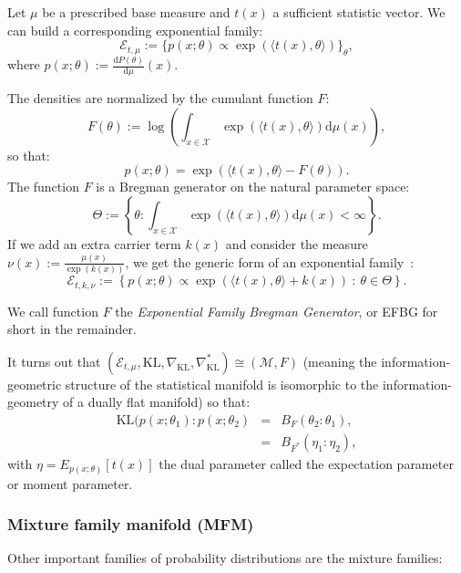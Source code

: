 \documentclass[graybox]{svmult}
\def\inner#1#2{{\langle #1,#2\rangle}}
\def\dmu{\mathrm{d}\mu}
\def\dP{\mathrm{d}P}
\def\KL{\mathrm{KL}}
\def\eqdef{:=}
\def\calE{\mathcal{E}}
\def\calX{\mathcal{X}}
\def\calM{\mathcal{M}}
\def\st{{\ :\ }}
\begin{document}
	\begin{definition}\label{def:ef}
	Let $\mu$ be a prescribed  base measure and $t(x)$ a sufficient statistic vector.
	We can build  a corresponding exponential family:
	\begin{equation}
	\calE_{t,\mu}\eqdef\{p(x;\theta) \propto \exp(\inner{t(x)}{\theta})\}_\theta,
	\end{equation}
	where $p(x;\theta) \eqdef \frac{\dP(\theta)}{\dmu}(x)$.
	
	The densities are normalized by the cumulant function $F$:
	\begin{equation}\label{eq:cf}
	F(\theta)  \eqdef \log \left(\int_{x\in\calX} \exp(\inner{t(x)}{\theta})\dmu(x)\right),
	\end{equation}
	so that:
	\begin{equation}
	p(x;\theta) = \exp(\inner{t(x)}{\theta}-F(\theta)).
	\end{equation}
	The function $F$  is a Bregman generator on the natural parameter space:
	\begin{equation}
	\Theta\eqdef\left\{\theta : \int_{x\in\calX} \exp(\inner{t(x)}{\theta})\dmu(x)<\infty \right\}.
	\end{equation}
	If we add an extra carrier term $k(x)$ and consider the measure $\nu(x)\eqdef \frac{\mu(x)}{\exp(k(x))}$, we get the generic form of an exponential family~\cite{flashcards-2009}:
	\begin{equation}
	\calE_{t,k,\nu}\eqdef\left\{p(x;\theta) \propto \exp(\inner{t(x)}{\theta}+k(x)) \st \theta\in\Theta\right\}.
	\end{equation}
	\end{definition}
	
	We call function $F$ the {\em Exponential Family Bregman Generator}, or EFBG for short in the remainder.
	
	
	It turns out that $(\calE_{t,\mu},\KL,\nabla_\KL,\nabla_\KL^*)\cong (\calM,F)$ (meaning the information-geometric structure of the statistical manifold is isomorphic to the information-geometry of a dually flat manifold) so that:
	\begin{eqnarray}
	\KL(p(x;\theta_1):p(x;\theta_2)&=&B_F(\theta_2:\theta_1),\label{eq:KLBDEF}\\
	&=& B_{F^*}(\eta_1:\eta_2),\label{eq:KLBDEFD}
	\end{eqnarray}
	with $\eta=E_{p(x;\theta)}[t(x)]$ the dual parameter called the expectation parameter or moment parameter.


\subsubsection{Mixture family manifold (MFM)}
Other important families of probability distributions are the mixture families:
	
\end{document}
